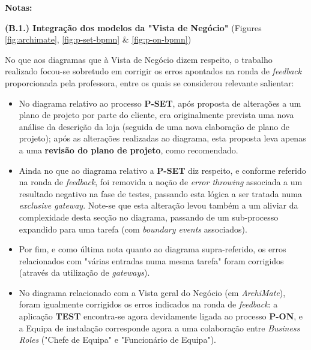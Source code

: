 \documentclass[12pt,a4paper]{article}
\begin{document}
\begin{tcolorbox}[enhanced jigsaw,colback=bg,boxrule=0pt,arc=4pt]
  \begin{large}
    \textbf{Notas:}
  \end{large}

  \begin{small}
    \textbf{(B.1.) Integração dos modelos da "Vista de Negócio"} (Figures \ref{fig:archimate}, \ref{fig:p-set-bpmn} \& \ref{fig:p-on-bpmn})
  \end{small}
  No que aos diagramas que à Vista de Negócio dizem respeito, o trabalho realizado focou-se
  sobretudo em corrigir os erros apontados na ronda de \textit{feedback} proporcionada
  pela professora, entre os quais se considerou relevante salientar:
  \begin{itemize}
    \item No diagrama relativo ao processo \textbf{P-SET}, após proposta de alterações a um
          plano de projeto por parte do cliente, era originalmente prevista uma nova análise da
          descrição da loja (seguida de uma nova elaboração de plano de projeto); após as alterações
          realizadas ao diagrama, esta proposta leva apenas a uma \textbf{revisão do plano de projeto},
          como recomendado.
    \item Ainda no que ao diagrama relativo a \textbf{P-SET} diz respeito, e conforme referido
          na ronda de \textit{feedback}, foi removida a noção de \textit{error throwing} associada a um
          resultado negativo na fase de testes, passando esta lógica a ser tratada numa \textit{exclusive
            gateway}. Note-se que esta alteração levou também a um aliviar da complexidade desta secção
          no diagrama, passando de um sub-processo expandido para uma tarefa (com \textit{boundary events} associados).
    \item Por fim, e como última nota quanto ao diagrama supra-referido, os erros relacionados com "várias entradas
          numa mesma tarefa" foram corrigidos (através da utilização de \textit{gateways}).
    \item No diagrama relacionado com a Vista geral do Negócio (em \textit{ArchiMate}),
          foram igualmente corrigidos os erros indicados na ronda de \textit{feedback}: a aplicação
          \textbf{TEST} encontra-se agora devidamente ligada ao processo \textbf{P-ON}, e a Equipa de instalação
          corresponde agora a uma colaboração entre \textit{Business Roles} ("Chefe de Equipa"
          e "Funcionário de Equipa").
  \end{itemize}


\end{tcolorbox}
\end{document}
